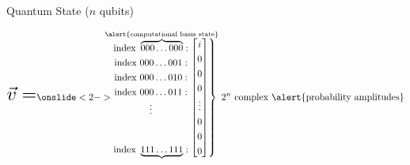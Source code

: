 \begin{frame}{Quantum State ($n$ qubits)}


\[ \scalebox{2}{$ \vec v  = $} %
	\def\arraystretch{1.3}
    \onslide<2->{
    \begin{matrix*}[c]
    \text{index }\overbrace{000\dots000}^{\mathclap{\text{\alert{computational basis state}}}}:\\\text{index }{000\dots001}:\\\text{index }{000\dots010}:\\\text{index }{000\dots011}:\\\vdots\vspace{1em}\\\\\text{index }\underbrace{111\dots111}_{\vspace{3em}}:\\
    \end{matrix*}
    }
    \left.
    \begin{bmatrix*}[c]
     i \\0 \\ 0\\ 0 \\ \vdots \\ 0 \\ 0\\ 0  \\
    \end{bmatrix*}
    \right\}\text{ $2^n$ complex \alert{probability amplitudes}}
\]

\end{frame}



